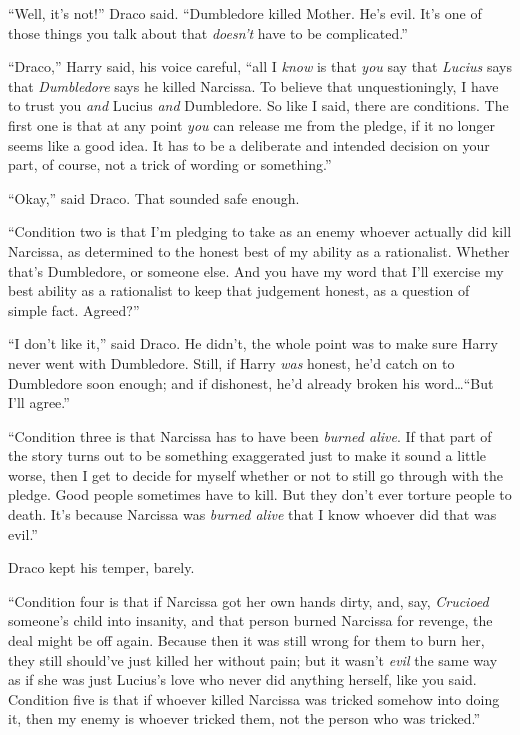 “Well, it’s not!” Draco said. “Dumbledore killed Mother. He’s evil. It’s one of those things you talk about that \emph{doesn’t} have to be complicated.”

“Draco,” Harry said, his voice careful, “all I \emph{know} is that \emph{you} say that \emph{Lucius} says that \emph{Dumbledore} says he killed Narcissa. To believe that unquestioningly, I have to trust you \emph{and} Lucius \emph{and} Dumbledore. So like I said, there are conditions. The first one is that at any point \emph{you} can release me from the pledge, if it no longer seems like a good idea. It has to be a deliberate and intended decision on your part, of course, not a trick of wording or something.”

“Okay,” said Draco. That sounded safe enough.

“Condition two is that I’m pledging to take as an enemy whoever actually did kill Narcissa, as determined to the honest best of my ability as a rationalist. Whether that’s Dumbledore, or someone else. And you have my word that I’ll exercise my best ability as a rationalist to keep that judgement honest, as a question of simple fact. Agreed?”

“I don’t like it,” said Draco. He didn’t, the whole point was to make sure Harry never went with Dumbledore. Still, if Harry \emph{was} honest, he’d catch on to Dumbledore soon enough; and if dishonest, he’d already broken his word…“But I’ll agree.”

“Condition three is that Narcissa has to have been \emph{burned alive}. If that part of the story turns out to be something exaggerated just to make it sound a little worse, then I get to decide for myself whether or not to still go through with the pledge. Good people sometimes have to kill. But they don’t ever torture people to death. It’s because Narcissa was \emph{burned alive} that I know whoever did that was evil.”

Draco kept his temper, barely.

“Condition four is that if Narcissa got her own hands dirty, and, say, \emph{Crucioed} someone’s child into insanity, and that person burned Narcissa for revenge, the deal might be off again. Because then it was still wrong for them to burn her, they still should’ve just killed her without pain; but it wasn’t \emph{evil} the same way as if she was just Lucius’s love who never did anything herself, like you said. Condition five is that if whoever killed Narcissa was tricked somehow into doing it, then my enemy is whoever tricked them, not the person who was tricked.”

